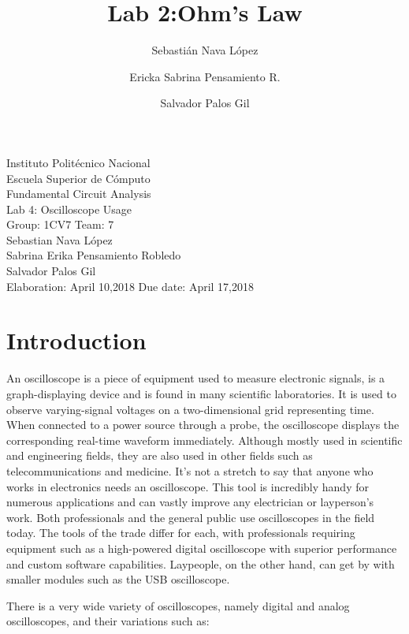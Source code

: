 \documentclass[letterpaper]{article}
\title{Lab 2:Ohm's Law}
\author{
    Sebastián Nava López\\
    \and
    Ericka Sabrina Pensamiento R.\\
    \and
    Salvador Palos Gil
}
\begin{document}
\begin{titlepage}
    \centering
    {\Huge Instituto Politécnico Nacional}\\[3ex]
    {\huge Escuela Superior de Cómputo}\\[8ex]
    {\huge Fundamental Circuit Analysis}\\[12ex]
    {\Large Lab 4: Oscilloscope Usage}\\[20ex]
    {\Large Group: 1CV7 Team: 7 \\[8ex]
    Sebastian Nava López\\[4ex]
    Sabrina Erika Pensamiento Robledo\\[4ex]
    Salvador Palos Gil\\[18ex]
    }
    \large{Elaboration: April 10,2018\hspace{8em} Due date: April 17,2018}
\end{titlepage}
\tableofcontents
\newpage
\section{Introduction}
An oscilloscope is a piece of equipment used to measure electronic signals, is a graph-displaying device and is found in many scientific laboratories. It is used to observe varying-signal voltages on a two-dimensional grid representing time. When connected to a power source through a probe, the oscilloscope displays the corresponding real-time waveform immediately. Although mostly used in scientific and engineering fields, they are also used in other fields such as telecommunications and medicine. It’s not a stretch to say that anyone who works in electronics needs an oscilloscope. This tool is incredibly handy for numerous applications and can vastly improve any electrician or layperson’s work. Both professionals and the general public use oscilloscopes in the field today. The tools of the trade differ for each, with professionals requiring equipment such as a high-powered digital oscilloscope with superior performance and custom software capabilities. Laypeople, on the other hand, can get by with smaller modules such as the USB oscilloscope.

There is a very wide variety of oscilloscopes, namely digital and analog oscilloscopes, and their variations such as:
\end{document}
